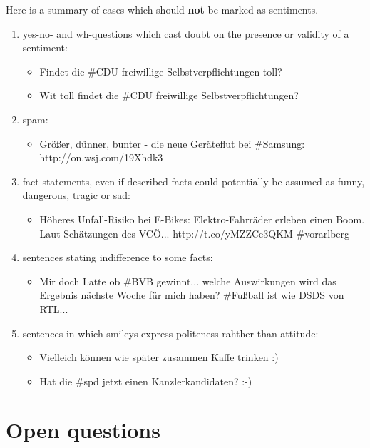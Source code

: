 \documentclass[11pt,a4paper]{article}
\begin{document}
Here is a summary of cases which should \textbf{not} be marked as
sentiments.
\begin{enumerate}
\item \label{no-sent:question} yes-no- and wh-questions which cast doubt on the presence or validity of a sentiment:
  \begin{itemize}
  \item Findet die \#{}CDU freiwillige Selbstverpflichtungen toll?
  \item Wit toll findet die \#{}CDU freiwillige Selbstverpflichtungen?
  \end{itemize}

\item spam:
  \begin{itemize}
  \item Gr\"o\ss{}er, d\"unner, bunter - die neue Ger\"ateflut bei
    \#Samsung: http://on.wsj.com/19Xhdk3
  \end{itemize}

\item fact statements, even if described facts could potentially be
  assumed as funny, dangerous, tragic or sad:
  \begin{itemize}
  \item H\"oheres Unfall-Risiko bei E-Bikes: Elektro-Fahrr\"ader
    erleben einen Boom. Laut Sch\"atzungen des
    VC\"O... http://t.co/yMZZCe3QKM \#{}vorarlberg
  \end{itemize}

\item sentences stating indifference to some facts:
  \begin{itemize}
  \item Mir doch Latte ob \#{}BVB gewinnt... welche Auswirkungen wird
    das Ergebnis n\"achste Woche f\"ur mich haben? \#{}Fu\ss{}ball ist
    wie DSDS von RTL...
  \end{itemize}

\item sentences in which smileys express politeness rahther than attitude:
  \begin{itemize}
  \item Vielleich k\"onnen wie sp\"ater zusammen Kaffe trinken :)
  \item Hat die \#{}spd jetzt einen Kanzlerkandidaten? :-)
  \end{itemize}
\end{enumerate}

\section{Open questions}
\end{document}
